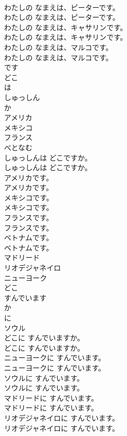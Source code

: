 \documentclass[8pt]{extreport}
\begin{document}
\begin{CJK}{UTF8}{min}
\\	わたしの なまえは、ピーターです。	
\\	わたしの なまえは、ピーターです。 
\\	わたしの なまえは、キャサリンです。	
\\	わたしの なまえは、キャサリンです。 
\\	わたしの なまえは、マルコです。	
\\	わたしの なまえは、マルコです。 
\\	です
\\	どこ
\\	は
\\	しゅっしん
\\	か
\\	アメリカ
\\	メキシコ
\\	フランス
\\	べとなむ
\\	しゅっしんは どこですか。	
\\	しゅっしんは どこですか。 
\\	アメリカです。	
\\	アメリカです。 
\\	メキシコです。	
\\	メキシコです。 
\\	フランスです。	
\\	フランスです。 
\\	ベトナムです。	
\\	ベトナムです。 
\\	マドリード
\\	リオデジャネイロ
\\	ニューヨーク
\\	どこ
\\	すんでいます
\\	か
\\	に
\\	ソウル
\\	どこに すんでいますか。	
\\	どこに すんでいますか。 
\\	ニューヨークに すんでいます。	
\\	ニューヨークに すんでいます。 
\\	ソウルに すんでいます。	
\\	ソウルに すんでいます。 
\\	マドリードに すんでいます。	
\\	マドリードに すんでいます。 
\\	リオデジャネイロに すんでいます。	
\\	リオデジャネイロに すんでいます。 

\end{CJK}
\end{document}
